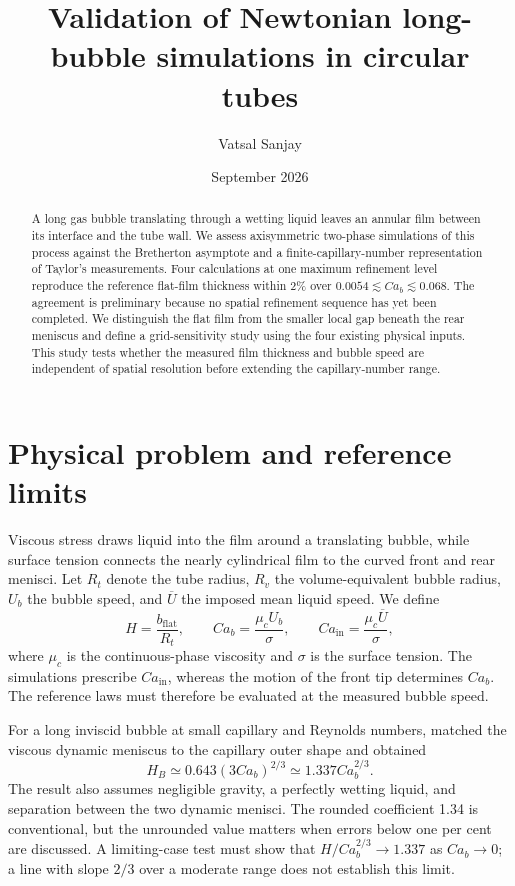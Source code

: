 \documentclass[11pt,a4paper]{article}
\title{Validation of Newtonian long-bubble simulations in circular tubes}
\author{Vatsal Sanjay}
\date{September 2026}
\begin{document}
\maketitle

\begin{abstract}
A long gas bubble translating through a wetting liquid leaves an annular film
between its interface and the tube wall. We assess axisymmetric two-phase
simulations of this process against the Bretherton asymptote and a
finite-capillary-number representation of Taylor's measurements. Four
calculations at one maximum refinement level reproduce the reference flat-film
thickness within 2\% over $0.0054\lesssim Ca_b\lesssim0.068$. The agreement is
preliminary because no spatial refinement sequence has yet been completed.
We distinguish the flat film from the smaller local gap beneath the rear
meniscus and define a grid-sensitivity study using the four existing physical
inputs. This study tests whether the measured film thickness and bubble speed
are independent of spatial resolution before extending the capillary-number
range.
\end{abstract}

\section{Physical problem and reference limits}

Viscous stress draws liquid into the film around a translating bubble, while
surface tension connects the nearly cylindrical film to the curved front and
rear menisci. Let $R_t$ denote the tube radius, $R_v$ the volume-equivalent
bubble radius, $U_b$ the bubble speed, and $\overline U$ the imposed mean
liquid speed. We define
\begin{equation}
  H=\frac{b_{\mathrm{flat}}}{R_t}, \qquad
  Ca_b=\frac{\mu_c U_b}{\sigma}, \qquad
  Ca_{\mathrm{in}}=\frac{\mu_c\overline U}{\sigma},
  \label{eq:definitions}
\end{equation}
where $\mu_c$ is the continuous-phase viscosity and $\sigma$ is the surface
tension. The simulations prescribe $Ca_{\mathrm{in}}$, whereas the motion of
the front tip determines $Ca_b$. The reference laws must therefore be
evaluated at the measured bubble speed.

For a long inviscid bubble at small capillary and Reynolds numbers,
\citet{bretherton1961motion} matched the viscous dynamic meniscus to the
capillary outer shape and obtained
\begin{equation}
  H_B\simeq0.643(3Ca_b)^{2/3}\simeq1.337Ca_b^{2/3}.
  \label{eq:bretherton-film}
\end{equation}
The result also assumes negligible gravity, a perfectly wetting liquid, and
separation between the two dynamic menisci. The rounded coefficient 1.34 is
conventional, but the unrounded value matters when errors below one per cent
are discussed. A limiting-case test must show that
$H/Ca_b^{2/3}\rightarrow1.337$ as $Ca_b\rightarrow0$; a line with slope $2/3$
over a moderate range does not establish this limit.
\end{document}
